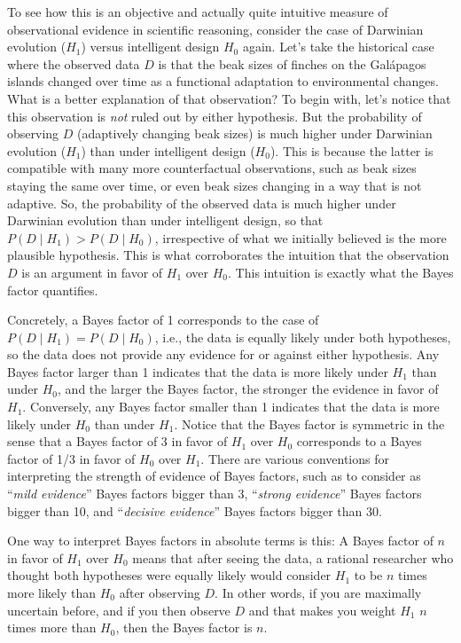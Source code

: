\documentclass[
  doc,
  floatsintext,
  longtable,
  nolmodern,
  notxfonts,
  notimes,
  colorlinks=true,linkcolor=blue,citecolor=blue,urlcolor=blue]{apa7}
\begin{document}
To see how this is an objective and actually quite intuitive measure of
observational evidence in scientific reasoning, consider the case of
Darwinian evolution (\(H_1\)) versus intelligent design \(H_0\) again.
Let's take the historical case where the observed data \(D\) is that the
beak sizes of finches on the Galápagos islands changed over time as a
functional adaptation to environmental changes. What is a better
explanation of that observation? To begin with, let's notice that this
observation is \emph{not} ruled out by either hypothesis. But the
probability of observing \(D\) (adaptively changing beak sizes) is much
higher under Darwinian evolution (\(H_1\)) than under intelligent design
(\(H_0\)). This is because the latter is compatible with many more
counterfactual observations, such as beak sizes staying the same over
time, or even beak sizes changing in a way that is not adaptive. So, the
probability of the observed data is much higher under Darwinian
evolution than under intelligent design, so that
\(P(D \mid H_1) > P(D \mid H_0)\), irrespective of what we initially
believed is the more plausible hypothesis. This is what corroborates the
intuition that the observation \(D\) is an argument in favor of \(H_1\)
over \(H_0\). This intuition is exactly what the Bayes factor
quantifies.

Concretely, a Bayes factor of 1 corresponds to the case of
\(P(D \mid H_1) = P(D \mid H_0)\), i.e., the data is equally likely
under both hypotheses, so the data does not provide any evidence for or
against either hypothesis. Any Bayes factor larger than 1 indicates that
the data is more likely under \(H_1\) than under \(H_0\), and the larger
the Bayes factor, the stronger the evidence in favor of \(H_1\).
Conversely, any Bayes factor smaller than 1 indicates that the data is
more likely under \(H_0\) than under \(H_1\). Notice that the Bayes
factor is symmetric in the sense that a Bayes factor of 3 in favor of
\(H_1\) over \(H_0\) corresponds to a Bayes factor of 1/3 in favor of
\(H_0\) over \(H_1\). There are various conventions for interpreting the
strength of evidence of Bayes factors, such as to consider as
``\emph{mild evidence}'' Bayes factors bigger than 3, ``\emph{strong
evidence}'' Bayes factors bigger than 10, and ``\emph{decisive
evidence}'' Bayes factors bigger than 30.

One way to interpret Bayes factors in absolute terms is this: A Bayes
factor of \(n\) in favor of \(H_1\) over \(H_0\) means that after seeing
the data, a rational researcher who thought both hypotheses were equally
likely would consider \(H_1\) to be \(n\) times more likely than \(H_0\)
after observing \(D\). In other words, if you are maximally uncertain
before, and if you then observe \(D\) and that makes you weight \(H_1\)
\(n\) times more than \(H_0\), then the Bayes factor is \(n\).
\end{document}
